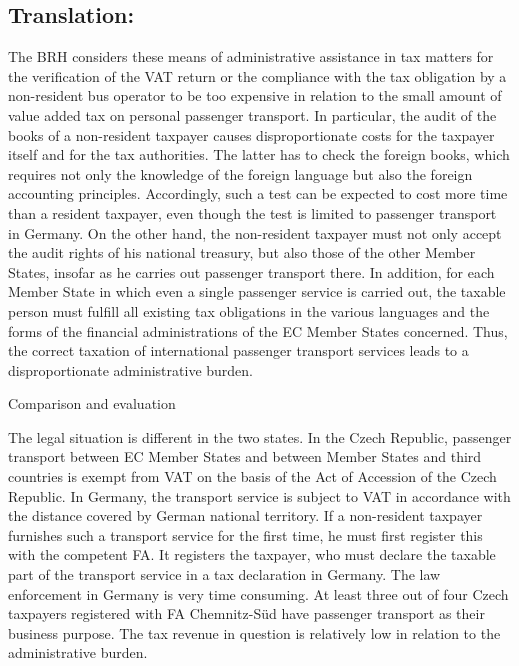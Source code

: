 \documentclass[10pt]{article}
\begin{document}
\pagebreak

\subsection*{Translation:}

The BRH considers these means of administrative assistance in tax matters for the verification of the VAT return or the compliance with the tax obligation by a non-resident bus operator to be too expensive in relation to the small amount of value added tax on personal passenger transport.
In particular, the audit of the books of a non-resident taxpayer causes disproportionate costs for the taxpayer itself and for the tax authorities.
The latter has to check the foreign books, which requires not only the knowledge of the foreign language but also the foreign accounting principles.
Accordingly, such a test can be expected to cost more time than a resident taxpayer, even though the test is limited to passenger transport in Germany.
On the other hand, the non-resident taxpayer must not only accept the audit rights of his national treasury, but also those of the other Member States, insofar as he carries out passenger transport there.
In addition, for each Member State in which even a single passenger service is carried out, the taxable person must fulfill all existing tax obligations in the various languages and the forms of the financial administrations of the EC Member States concerned.
Thus, the correct taxation of international passenger transport services leads to a disproportionate administrative burden.


Comparison and evaluation

The legal situation is different in the two states.
In the Czech Republic, passenger transport between EC Member States and between Member States and third countries is exempt from VAT on the basis of the Act of Accession of the Czech Republic.
In Germany, the transport service is subject to VAT in accordance with the distance covered by German national territory.
If a non-resident taxpayer furnishes such a transport service for the first time, he must first register this with the competent FA.
It registers the taxpayer, who must declare the taxable part of the transport service in a tax declaration in Germany.
The law enforcement in Germany is very time consuming.
At least three out of four Czech taxpayers registered with FA Chemnitz-Süd have passenger transport as their business purpose.
The tax revenue in question is relatively low in relation to the administrative burden.
\end{document}
